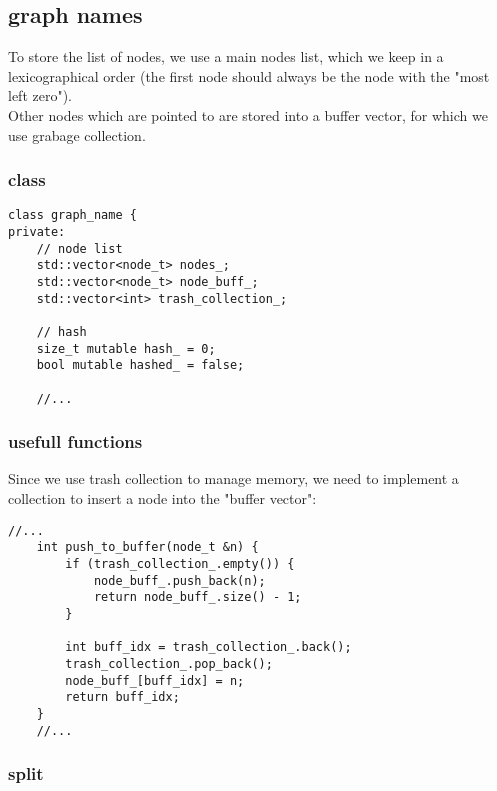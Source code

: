 \documentclass[11pt]{article}
\begin{document}
\subsection{graph names}

To store the list of nodes, we use a main nodes list, which we keep in a lexicographical order (the first node should always be the node with the "most left zero").\\

Other nodes which are pointed to are stored into a buffer vector, for which we use grabage collection. 

\subsubsection{class}

\begin{lstlisting}[style=CStyle]
class graph_name {
private:
	// node list 
	std::vector<node_t> nodes_;
	std::vector<node_t> node_buff_;
	std::vector<int> trash_collection_;

	// hash
	size_t mutable hash_ = 0;
	bool mutable hashed_ = false;
	
	//...
\end{lstlisting}

\subsubsection{usefull functions}

Since we use trash collection to manage memory, we need to implement a collection to insert a node into the "buffer vector":

\begin{lstlisting}[style=CStyle]
	//...
	int push_to_buffer(node_t &n) {
		if (trash_collection_.empty()) {
			node_buff_.push_back(n);
			return node_buff_.size() - 1;
		}

		int buff_idx = trash_collection_.back();
		trash_collection_.pop_back();
		node_buff_[buff_idx] = n;
		return buff_idx;
	}
	//...
\end{lstlisting}

\subsubsection{split}
\end{document}
